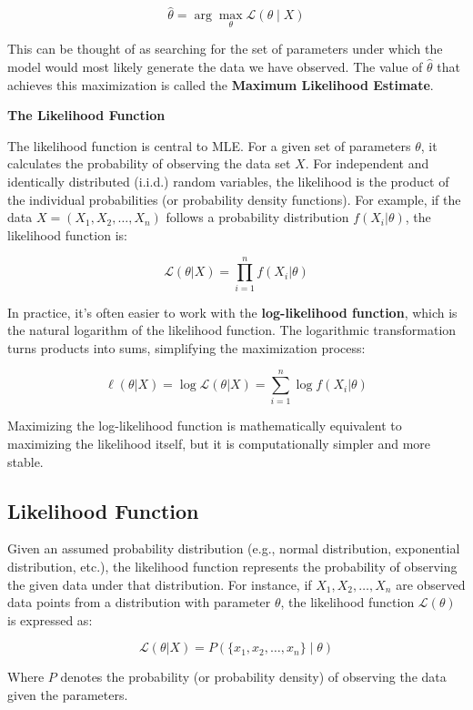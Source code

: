 \documentclass[
  12 pt,
  a4paper,
]{book}
\numberwithin{equation}{section}
\theoremstyle{plain}      %
\theoremstyle{definition} %
\theoremstyle{remark}     %
\theoremstyle{note}         %
\begin{document}
\[
\hat{\theta} = \arg \max_{\theta} \mathcal{L}(\theta\! \mid\! X)
\]

This can be thought of as searching for the set of parameters under
which the model would most likely generate the data we have observed.
The value of \(\hat{\theta}\) that achieves this maximization is called
the \textbf{Maximum Likelihood Estimate}.

\textbf{The Likelihood Function}

The likelihood function is central to MLE. For a given set of parameters
\(\theta\), it calculates the probability of observing the data set
\(X\). For independent and identically distributed (i.i.d.) random
variables, the likelihood is the product of the individual probabilities
(or probability density functions). For example, if the data
\(X = (X_1, X_2, \dots, X_n)\) follows a probability distribution
\(f(X_i | \theta)\), the likelihood function is:

\[
\mathcal{L}(\theta | X) = \prod_{i=1}^{n} f(X_i | \theta)
\]

In practice, it's often easier to work with the \textbf{log-likelihood
function}, which is the natural logarithm of the likelihood function.
The logarithmic transformation turns products into sums, simplifying the
maximization process:

\[
\ell(\theta | X) = \log \mathcal{L}(\theta | X) = \sum_{i=1}^{n} \log f(X_i | \theta)
\]

Maximizing the log-likelihood function is mathematically equivalent to
maximizing the likelihood itself, but it is computationally simpler and
more stable.

\hypertarget{likelihood-function}{%
\subsection{Likelihood Function}\label{likelihood-function}}

Given an assumed probability distribution (e.g., normal distribution,
exponential distribution, etc.), the likelihood function represents the
probability of observing the given data under that distribution. For
instance, if \(X_1, X_2, \dots, X_n\) are observed data points from a
distribution with parameter \(\theta\), the likelihood function
\(\mathcal{L}(\theta)\) is expressed as:

\[
\mathcal{L}(\theta | X) = P(\{x_1, x_2, \dots, x_n \}\! \mid\! \theta)
\]

Where \(P\) denotes the probability (or probability density) of
observing the data given the parameters.
\end{document}
